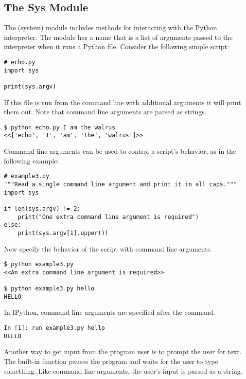\subsection*{The Sys Module} %

The  (system) module includes methods for interacting with the Python interpreter.
The module has a name  that is a list of arguments passed to the interpreter when it runs a Python file.
Consider the following simple script:

\begin{lstlisting}
# echo.py
import sys

print(sys.argv)
\end{lstlisting}

If this file is run from the command line with additional arguments it will print them out.
Note that command line arguments are parsed as strings.

\begin{lstlisting}
$ python echo.py I am the walrus
<<['echo', 'I', 'am', 'the', 'walrus']>>
\end{lstlisting}

Command line arguments can be used to control a script's behavior, as in the following example:

\begin{lstlisting}
# example3.py
"""Read a single command line argument and print it in all caps."""
import sys

if len(sys.argv) != 2:
    print("One extra command line argument is required")
else:
    print(sys.argv[1].upper())
\end{lstlisting}

Now specify the behavior of the script with command line arguments.

\begin{lstlisting}
$ python example3.py
<<An extra command line argument is required>>

$ python example3.py hello
HELLO
\end{lstlisting}

In IPython, command line arguments are specified after the  command.

\begin{lstlisting}
In [1]: run example3.py hello
HELLO
\end{lstlisting}

Another way to get input from the program user is to prompt the user for text.
The built-in function  pauses the program and waits for the user to type something.
Like command line arguments, the user's input is parsed as a string.


